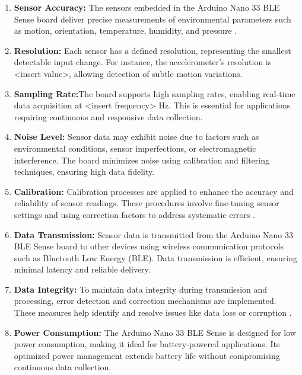 \begin{enumerate}
	\item \textbf{Sensor Accuracy:} The sensors embedded in the Arduino Nano 33 BLE Sense board deliver precise measurements of environmental parameters such as motion, orientation, temperature, humidity, and pressure \cite{Dhow:2024}.
	
	\item \textbf{Resolution:} Each sensor has a defined resolution, representing the smallest detectable input change. For instance, the accelerometer’s resolution is \textless{}insert value\textgreater{}, allowing detection of subtle motion variations.
	
	\item \textbf{Sampling Rate:}The board supports high sampling rates, enabling real-time data acquisition at \textless{}insert frequency\textgreater{} Hz. This is essential for applications requiring continuous and responsive data collection.
	
	\item \textbf{Noise Level:} Sensor data may exhibit noise due to factors such as environmental conditions, sensor imperfections, or electromagnetic interference. The board minimizes noise using calibration and filtering techniques, ensuring high data fidelity.
	
	\item \textbf{Calibration:} Calibration processes are applied to enhance the accuracy and reliability of sensor readings. These procedures involve fine-tuning sensor settings and using correction factors to address systematic errors \cite{Edm:2015}.
	
	\item \textbf{Data Transmission:} Sensor data is transmitted from the Arduino Nano 33 BLE Sense board to other devices using wireless communication protocols such as Bluetooth Low Energy (BLE). Data transmission is efficient, ensuring minimal latency and reliable delivery.
	
	\item \textbf{Data Integrity:} To maintain data integrity during transmission and processing, error detection and correction mechanisms are implemented. These measures help identify and resolve issues like data loss or corruption \cite{TensorFlow:2023}.
	
	\item \textbf{Power Consumption:} The Arduino Nano 33 BLE Sense is designed for low power consumption, making it ideal for battery-powered applications. Its optimized power management extends battery life without compromising continuous data collection.
\end{enumerate}

